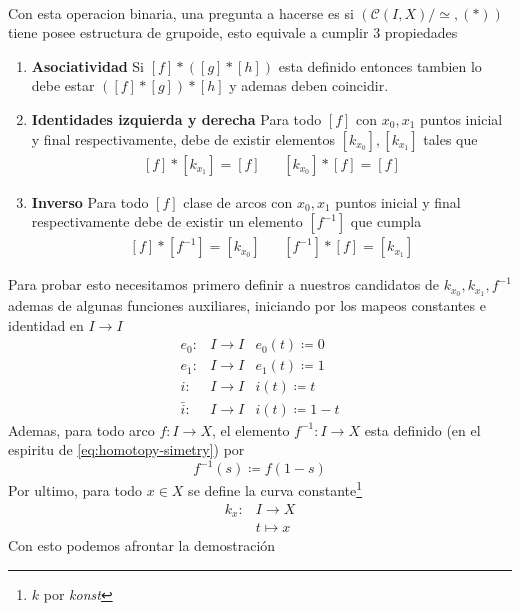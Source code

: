 \paragraph{} Con esta operacion binaria, una pregunta a hacerse es si
\((\mathcal C (I , X)/\simeq , (*))\) tiene posee estructura de
grupoide, esto equivale a cumplir 3 propiedades
\begin{enumerate}
\item \textbf{Asociatividad} Si \([f] * ([g] * [h])\) esta definido entonces
  tambien lo debe estar \(([f] * [g]) * [h]\) y ademas deben coincidir.
\item \textbf{Identidades izquierda y derecha} Para todo \([f]\) con
  \(x_0, x_1\) puntos inicial y final respectivamente, debe de
existir elementos \([k_{x_0}], [k_{x_1}]\) tales que
\[ \begin{matrix}
    [f] * [k_{x_1}] = [f] & & [k_{x_0}] * [f] = [f]
  \end{matrix}
\]
\item \textbf{Inverso} Para todo \([f]\) clase de arcos con \(x_0, x_1\)
  puntos inicial y final respectivamente debe de existir un elemento
  \([f^{-1}]\) que cumpla
\[ \begin{matrix}
    [f] * [f^{-1}] = [k_{x_0}] & & [f^{-1}] * [f] = [k_{x_1}]
  \end{matrix}
\]
\end{enumerate}
Para probar esto necesitamos primero definir a nuestros candidatos de
\(k_{x_0}, k_{x_1}, f^{-1}\) ademas de algunas funciones auxiliares,
iniciando por los mapeos constantes e identidad en \(I \to I\)
\[ \begin{matrix}
     e_0 : & I \to I & e_0(t) \coloneqq 0 \\
     e_1 : & I \to I & e_1(t) \coloneqq 1 \\
     i :   & I \to I & i(t) \coloneqq t \\
     \bar{i} : & I \to I & i(t) \coloneqq 1 - t
   \end{matrix}
   \]
Ademas, para todo arco \(f : I \to X \), el elemento \(f^{-1} : I \to X \) esta
definido (en el espiritu de \eqref{eq:homotopy-simetry}) por
\[ f^{-1} (s) \coloneqq f (1 - s) \]
Por ultimo, para todo \(x \in X \) se define la curva
constante\footnote{\(k\) por \emph{konst}}
\begin{align*}
  k_x : &I \to X \\
        &t \mapsto x
\end{align*}
Con esto podemos afrontar la demostración
